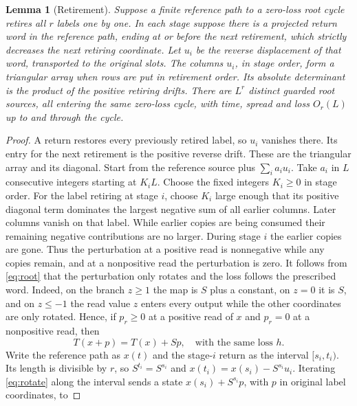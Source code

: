 \documentclass[11pt,reqno]{amsart}
\newtheorem{lemma}[theorem]{Lemma}
\theoremstyle{remark}
\begin{document}
\begin{lemma}[Retirement]\label{lem:retire}
Suppose a finite reference path to a zero-loss root cycle retires
all \(r\) labels one by one. In each stage suppose there is a projected
return word in the reference path, ending at or before the next
retirement, which strictly decreases the next retiring coordinate.
Let \(u_i\) be the reverse displacement of that word, transported to
the original slots. The columns \(u_i\), in stage order, form a
triangular array when rows are put in retirement order.
Its absolute determinant is the product of the positive retiring
drifts. There are \(L^r\) distinct guarded root sources, all entering
the same zero-loss cycle, with time, spread and loss \(O_r(L)\)
up to and through the cycle.
\end{lemma}
\begin{proof}
A return restores every previously retired label, so \(u_i\) vanishes
there. Its entry for the next retirement is the positive reverse drift.
These are the triangular array and its diagonal. Start from the reference
source plus \(\sum_i a_i u_i\).
Take \(a_i\) in \(L\) consecutive integers starting at \(K_iL\).
Choose the fixed integers \(K_i\ge0\) in stage order. For the label
retiring at stage \(i\), choose \(K_i\) large enough that its positive
diagonal term dominates the largest negative sum of all earlier columns.
Later columns vanish on that label. While earlier copies are being
consumed their remaining negative contributions are no larger. During
stage \(i\) the earlier copies are gone. Thus the perturbation at a
positive read is nonnegative while any copies remain, and at a
nonpositive read the perturbation is zero. It follows from
\eqref{eq:root} that the perturbation only rotates and the loss follows
the prescribed word. Indeed, on the branch \(z\ge1\) the map is \(S\)
plus a constant, on \(z=0\) it is \(S\), and on \(z\le-1\) the read
value \(z\) enters every output while the other coordinates are only
rotated. Hence, if \(p_r\ge0\) at a positive read of \(x\) and
\(p_r=0\) at a nonpositive read, then
\begin{equation}\label{eq:rotate}
 T(x+p)=T(x)+Sp,\quad\text{with the same loss } h .
\end{equation}
Write the reference path as \(x(t)\) and the stage-\(i\) return as the
interval \([s_i,t_i)\). Its length is divisible by \(r\), so
\(S^{t_i}=S^{s_i}\) and \(x(t_i)=x(s_i)-S^{s_i}u_i\). Iterating
\eqref{eq:rotate} along the interval sends a state
\(x(s_i)+S^{s_i}p\), with \(p\) in original label coordinates, to

\end{proof}
\end{document}
